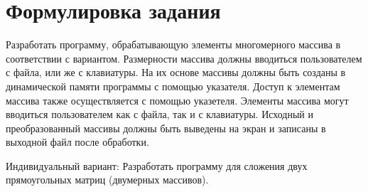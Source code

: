 \section*{Формулировка задания}

Разработать программу, обрабатывающую элементы многомерного
массива в соответствии с вариантом.
Размерности массива должны вводиться пользователем с файла, или же
с клавиатуры.
На их основе массивы должны быть созданы в динамической
памяти программы с помощью указателя.
Доступ к элементам массива также осуществляется с помощью указетеля.
Элементы массива могут вводиться пользователем как с файла, так и с
клавиатуры.
Исходный и преобразованный массивы должны быть выведены на экран
и записаны в выходной файл после обработки.

Индивидуальный вариант: Разработать программу для сложения двух 
прямоугольных матриц (двумерных массивов).

\newpage